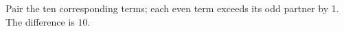 Pair the ten corresponding terms; each even term exceeds its odd partner by 1. The difference is $\boxed{10}$.
